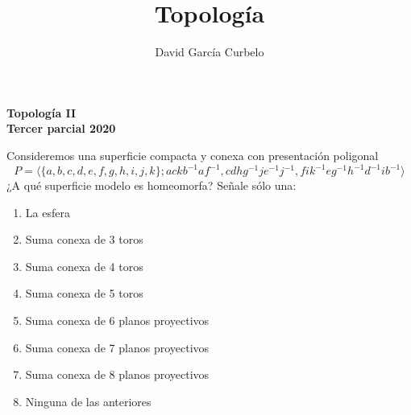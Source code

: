 \documentclass[fleqn]{article}
\author{David García Curbelo}
\title{Topología}
\begin{document}
    \doublespace

    \setcounter{page}{1}
    \pagestyle{plain}

    \begin{center}
        {\large\bf{Topología II}} \\
        \bf{Tercer parcial 2020}\\
        
    \end{center}

    Consideremos una superficie compacta y conexa con presentación poligonal
    $$P = \langle \{a,b,c,d,e,f,g,h,i,j,k\} ; ackb^{-1}af^{-1}, cdhg^{-1}je^{-1}j^{-1}, fik^{-1}eg^{-1}h^{-1}d^{-1}ib^{-1} \rangle$$
    ¿A qué superficie modelo es homeomorfa? Señale sólo una:

    \begin{enumerate}
        \item La esfera
        \item Suma conexa de 3 toros
        \item Suma conexa de 4 toros
        \item Suma conexa de 5 toros
        \item Suma conexa de 6 planos proyectivos
        \item Suma conexa de 7 planos proyectivos
        \item Suma conexa de 8 planos proyectivos
        \item Ninguna de las anteriores
    \end{enumerate}

    \newpage
\end{document}
